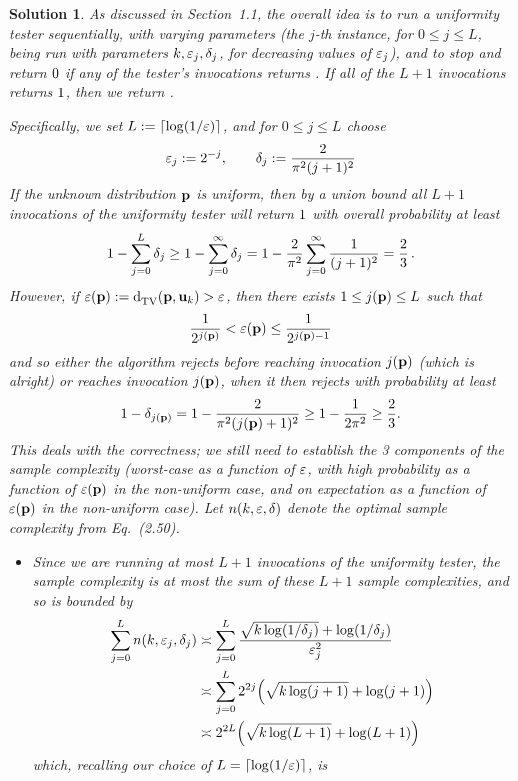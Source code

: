 \documentclass[biber]{nowfnt} %
\newtheorem{solution}{Solution}[chapter]
\begin{document}
\begin{solution}%
As discussed in Section~1.1, the overall idea is to run a uniformity tester sequentially, with varying parameters (the $j$-th instance, for $0\leq j\leq L$, being run with parameters $k, \varepsilon_j, \delta_j$, for decreasing values of $\varepsilon_j$), and to stop and return $0$ if any of the tester's invocations returns \reject. If all of the $L+1$ invocations returns $1$, then we return \accept.

Specifically, we set $L\eqdef \clg{\log(1/\dst)}$, and for $0\leq j\leq L$ choose
\[
	\varepsilon_j := 2^{-j}, \qquad \delta_j := \frac{2}{\pi^2(j+1)^2}
\]
If the unknown distribution $\mathbf{p}$ \emph{is} uniform, then by a union bound all $L+1$ invocations of the uniformity tester will return $1$ with overall probability at least
\[
	1 - \sum_{j=0}^L \delta_j \geq 1 - \sum_{j=0}^\infty \delta_j = 1 - \frac{2}{\pi^2}\sum_{j=0}^\infty \frac{1}{(j+1)^2} = \frac{2}{3}\,.
\]
However, if $\dst(\p)\eqdef \totalvardist{\p}{\uniformOn{\ab}} > \dst$, then there exists $1\leq j(\mathbf{p})\leq L$ such that
\[
	\frac{1}{2^{j(\mathbf{p})}} < \varepsilon(\mathbf{p}) \leq \frac{1}{2^{j(\mathbf{p})-1}}
\]
and so either the algorithm rejects before reaching invocation $j(\mathbf{p})$ (which is alright) or reaches invocation $j(\mathbf{p})$, when it then rejects with probability at least
\[
	1-\delta_{j(\mathbf{p})} = 1-\frac{2}{\pi^2(j(\mathbf{p})+1)^2} \geq 1-\frac{1}{2\pi^2} \geq \frac{2}{3}.
\]
This deals with the correctness; we still need to establish the 3 components of the sample complexity (worst-case as a function of $\varepsilon$, with high probability as a function of $\varepsilon(\mathbf{p})$ in the non-uniform case, and on expectation as a function of $\varepsilon(\mathbf{p})$ in the non-uniform case). Let $n(k,\varepsilon, \delta)$ denote the optimal sample complexity from Eq.~(2.50).
\begin{itemize}
\item Since we are running at most $L+1$ invocations of the uniformity tester, the sample complexity is at most the sum of these $L+1$ sample complexities, and so is bounded by
\begin{align*}
	\sum_{j=0}^L \ns(\ab,\dst_j, \errprob_j)
	&\asymp \sum_{j=0}^L  \frac{\sqrt{\ab\log(1/\errprob_j)} + \log(1/\errprob_j)}{\dst_j^2} \\
	&\asymp \sum_{j=0}^L  2^{2j}\Paren{\sqrt{\ab\log(j+1)} + \log(j+1)}\\
	&\asymp 2^{2L}\Paren{\sqrt{\ab\log(L+1)} + \log(L+1)}
\end{align*}
which, recalling our choice of $L=\clg{\log(1/\dst)}$, is

\end{itemize}
\end{solution}
\end{document}
